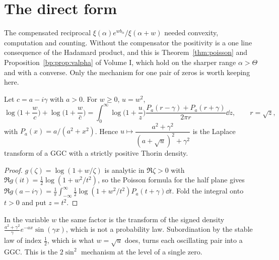 \section{The direct form}\label{ct:sec:direct}

The compensated reciprocal $\xi(\alpha)e^{wb_\alpha}/\xi(\alpha+w)$ needed convexity, computation and counting. Without the compensator the positivity is a one line consequence of the Hadamard product, and this is Theorem~\ref{thm:poisson} and Proposition~\ref{bp:prop:valpha} of Volume I, which hold on the sharper range $\alpha>\Theta$ and with a converse. Only the mechanism for one pair of zeros is worth keeping here.

\begin{lemma}\label{ct:lem:onepair}
Let $c=a-i\gamma$ with $a>0$. For $w\ge0$, $u=w^2$,
\[
\log\Big(1+\frac wc\Big)+\log\Big(1+\frac w{\bar c}\Big)=\int_0^\infty\log\Big(1+\frac uz\Big)\frac{P_a(r-\gamma)+P_a(r+\gamma)}{2\pi r}\dd z,\qquad r=\sqrt z,
\]
with $P_a(x)=a/(a^2+x^2)$. Hence $u\mapsto\dfrac{a^2+\gamma^2}{(a+\sqrt u)^2+\gamma^2}$ is the Laplace transform of a GGC with a strictly positive Thorin density.
\end{lemma}
\begin{proof}
$g(\zeta)=\log(1+w/\zeta)$ is analytic in $\Re\zeta>0$ with $\Re g(it)=\frac12\log(1+w^2/t^2)$, so the Poisson formula for the half plane gives $\Re g(a-i\gamma)=\frac1\pi\int_{-\infty}^\infty\frac12\log(1+w^2/t^2)P_a(t+\gamma)\dd t$. Fold the integral onto $t>0$ and put $z=t^2$.
\end{proof}
In the variable $w$ the same factor is the transform of the signed density $\frac{a^2+\gamma^2}{\gamma}e^{-ax}\sin(\gamma x)$, which is not a probability law. Subordination by the stable law of index $\frac12$, which is what $w=\sqrt u$ does, turns each oscillating pair into a GGC. This is the $2\sin^2$ mechanism at the level of a single zero.

